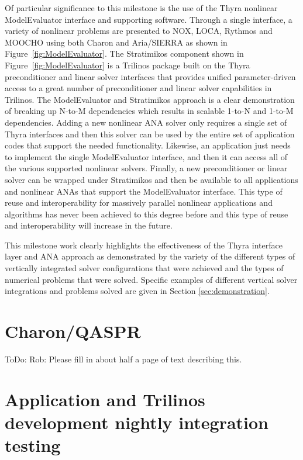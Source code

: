 \documentclass[pdf,ps2pdf,11pt]{SANDreport}
\begin{document}
Of particular significance to this milestone is the use of the Thyra nonlinear
ModelEvaluator interface and supporting software.  Through a single interface,
a variety of nonlinear problems are presented to NOX, LOCA, Rythmos and MOOCHO
using both Charon and Aria/SIERRA as shown in Figure~\ref{fig:ModelEvaluator}.
The Stratimikos component shown in Figure~\ref{fig:ModelEvaluator} is a
Trilinos package built on the Thyra preconditioner and linear solver
interfaces that provides unified parameter-driven access to a great number of
preconditioner and linear solver capabilities in Trilinos.  The ModelEvaluator
and Stratimikos approach is a clear demonstration of breaking up N-to-M
dependencies which results in scalable 1-to-N and 1-to-M dependencies.  Adding
a new nonlinear ANA solver only requires a single set of Thyra interfaces and
then this solver can be used by the entire set of application codes that
support the needed functionality.  Likewise, an application just needs to
implement the single ModelEvaluator interface, and then it can access all of
the various supported nonlinear solvers.  Finally, a new preconditioner or
linear solver can be wrapped under Stratimikos and then be available to all
applications and nonlinear ANAs that support the ModelEvaluator interface.
This type of reuse and interoperability for massively parallel nonlinear
applications and algorithms has never been achieved to this degree before and
this type of reuse and interoperability will increase in the future.

This milestone work clearly highlights the effectiveness of the Thyra
interface layer and ANA approach as demonstrated by the variety of the
different types of vertically integrated solver configurations that were
achieved and the types of numerical problems that were solved.  Specific
examples of different vertical solver integrations and problems solved are
given in Section {}\ref{sec:demonstration}.

%
\section{Charon/QASPR}
%

ToDo: Rob: Please fill in about half a page of text describing this.

%
\section{Application and Trilinos development nightly integration testing}
%
\end{document}
